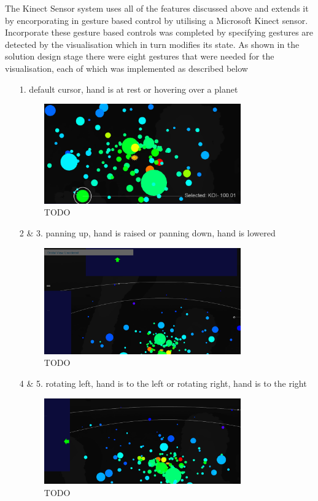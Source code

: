 The Kinect Sensor system uses all of the features discussed above and extends it
by encorporating in gesture based control by utilising a Microsoft Kinect
sensor. Incorporate these gesture based controls was completed by specifying
gestures are detected by the visualisation which in turn modifies its state. As
shown in the solution design stage there were eight gestures that were needed
for the visualisation, each of which was implemented as described below
\begin{enumerate}
 \item[1.] default cursor, hand is at rest or hovering over a planet
 
\begin{figure}[H]
  \centering
      \includegraphics[width=0.8\textwidth]{images/select.PNG}
  \caption{TODO}
  \label{fig:left}
\end{figure}

 \item[2 \& 3.] panning up, hand is raised or panning down, hand is lowered
 \begin{figure}[H]
  \centering
      \includegraphics[width=0.8\textwidth]{images/up.PNG}
  \caption{TODO}
  \label{fig:up}
\end{figure}
 
 \item[4 \& 5.] rotating left, hand is to the left or rotating right, hand is to
the right
 
\begin{figure}[H]
  \centering
      \includegraphics[width=0.8\textwidth]{images/left.PNG}
  \caption{TODO}
  \label{fig:left}
\end{figure}


\end{enumerate}
